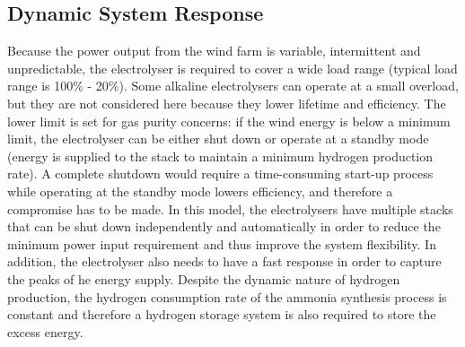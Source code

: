 \subsection{Dynamic System Response}
Because the power output from the wind farm is variable, intermittent and unpredictable, the electrolyser is required to cover a wide load range (typical load range is 100\% - 20\%\cite{gas}). Some alkaline electrolysers can operate at a small overload, but they are not considered here because they lower lifetime and efficiency. The lower limit is set for gas purity concerns: if the wind energy is below a minimum limit, the electrolyser can be either shut down or operate at a standby mode (energy is supplied to the stack to maintain a minimum hydrogen production rate).\cite{gas} A complete shutdown would require a time-consuming start-up process while operating at the standby mode lowers efficiency, and therefore a compromise has to be made. In this model, the electrolysers have multiple stacks that can be shut down independently and automatically in order to reduce the minimum power input requirement and thus improve the system flexibility.  In addition, the electrolyser also needs to have a fast response in order to capture the peaks of he energy supply. Despite the dynamic nature of hydrogen production, the hydrogen consumption rate of the ammonia synthesis process is constant and therefore a hydrogen storage system is also required to store the excess energy. 
